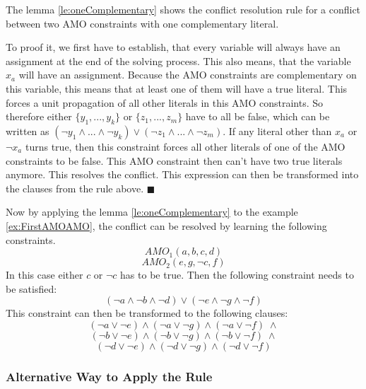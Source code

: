 The lemma \ref{le:oneComplementary} shows the conflict resolution rule for a conflict between two AMO constraints with one complementary literal. 

To proof it, we first have to establish, that every variable will always have an assignment at the end of the solving process. This also means, that the variable $x_a$ will have an assignment. Because the AMO constraints are complementary on this variable, this means that at least one of them will have a true literal. This forces a unit propagation of all other literals in this AMO constraints. So therefore either $\{y_1,...,y_k\}$ or $\{z_1,...,z_m\}$ have to all be false, which can be written as $(\neg y_1 \wedge ... \wedge \neg y_k) \vee (\neg z_1 \wedge ... \wedge \neg z_m)$. If any literal other than $x_a$ or $\neg x_a$ turns true, then this constraint forces all other literals of one of the AMO constraints to be false. This AMO constraint then can't have two true literals anymore. This resolves the conflict. This expression can then be transformed into the clauses from the rule above. $\blacksquare$

Now by applying the lemma \ref{le:oneComplementary} to the example \ref{ex:FirstAMOAMO}, the conflict can be resolved by learning the following constraints.
\begin{displaymath}
AMO_1(a,b,c,d)
\end{displaymath}
\begin{displaymath}
AMO_2(e,g,\neg c,f)
\end{displaymath}
In this case either $c$ or $\neg c$ has to be true. Then the following constraint needs to be satisfied:
\begin{displaymath}
(\neg a \wedge \neg b \wedge \neg d) \vee (\neg e \wedge \neg g \wedge \neg f)
\end{displaymath}
This constraint can then be transformed to the following clauses:
\begin{displaymath}
(\neg a \vee \neg e) \wedge (\neg a \vee \neg g) \wedge (\neg a \vee \neg f) \; \wedge
\end{displaymath}
\begin{displaymath}
(\neg b \vee \neg e) \wedge (\neg b \vee \neg g) \wedge (\neg b \vee \neg f) \; \wedge
\end{displaymath}
\begin{displaymath}
(\neg d \vee \neg e) \wedge (\neg d \vee \neg g) \wedge (\neg d \vee \neg f)
\end{displaymath}

\subsubsection{Alternative Way to Apply the Rule}

